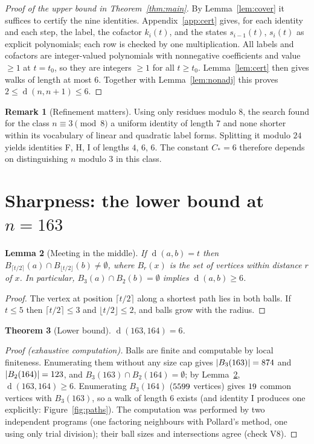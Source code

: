\documentclass[11pt]{article}
\newtheorem{theorem}{Theorem}[section]
\newtheorem{lemma}[theorem]{Lemma}
\theoremstyle{definition}
\newtheorem{remark}[theorem]{Remark}
\newcommand{\dist}{\operatorname{d}}
\begin{document}
\begin{proof}[Proof of the upper bound in Theorem~\ref{thm:main}]
By Lemma~\ref{lem:cover} it suffices to certify the nine identities. Appendix~\ref{app:cert} gives, for each identity and
each step, the label, the cofactor $k_i(t)$, and the states $s_{i-1}(t)$, $s_i(t)$ as explicit polynomials; each row is
checked by one multiplication. All labels and cofactors are integer-valued polynomials with nonnegative
coefficients and value $\ge1$ at $t=t_0$, so they are integers $\ge1$ for all $t\ge t_0$. Lemma~\ref{lem:cert} then gives walks of length at most $6$.
Together with Lemma~\ref{lem:nonadj} this proves $2\le\dist(n,n+1)\le 6$.
\end{proof}

\begin{remark}[Refinement matters]
Using only residues modulo $8$, the search found for the class $n\equiv3\pmod 8$ a uniform identity of length $7$ and none
shorter within its vocabulary of linear and quadratic label forms. Splitting it modulo $24$ yields identities F, H, I of lengths $4$, $6$, $6$. The constant
$C_\ast=6$ therefore depends on distinguishing $n$ modulo $3$ in this class.
\end{remark}

\section{Sharpness: the lower bound at $n=163$}\label{sec:lower}

\begin{lemma}[Meeting in the middle]\label{lem:mitm}
If $\dist(a,b)=t$ then $B_{\lceil t/2\rceil}(a)\cap B_{\lfloor t/2\rfloor}(b)\neq\emptyset$, where $B_r(x)$ is the set of vertices
within distance $r$ of $x$. In particular, $B_3(a)\cap B_2(b)=\emptyset$ implies $\dist(a,b)\ge6$.
\end{lemma}
\begin{proof}
The vertex at position $\lceil t/2\rceil$ along a shortest path lies in both balls. If $t\le5$ then
$\lceil t/2\rceil\le3$ and $\lfloor t/2\rfloor\le2$, and balls grow with the radius.
\end{proof}

\begin{theorem}[Lower bound]\label{thm:lower}
$\dist(163,164)=6$.
\end{theorem}
\begin{proof}[Proof (exhaustive computation)]
Balls are finite and computable by local finiteness. Enumerating them without any size cap gives
$|B_3(163)|=874$ and $|B_2(164)|=123$, and $B_3(163)\cap B_2(164)=\emptyset$; by Lemma~\ref{lem:mitm},
$\dist(163,164)\ge6$. Enumerating $B_3(164)$ ($5599$ vertices) gives $19$ common vertices with $B_3(163)$,
so a walk of length $6$ exists (and identity I produces one explicitly: Figure~\ref{fig:paths}). The computation was
performed by two independent programs (one factoring neighbours with Pollard's method, one using only trial division);
their ball sizes and intersections agree (check V8).
\end{proof}
\end{document}

